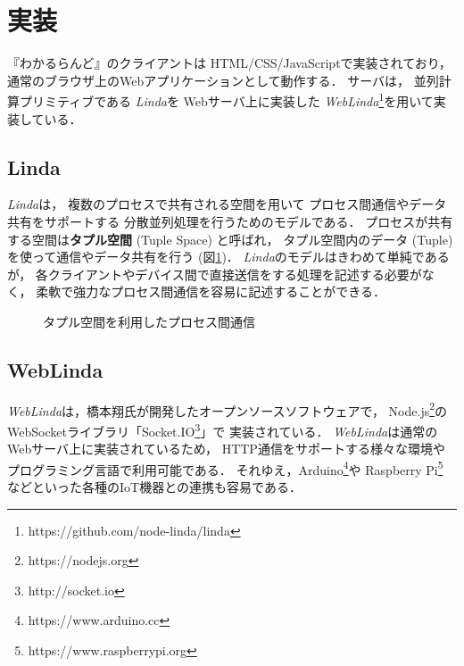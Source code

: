 \section{実装}

『わかるらんど』のクライアントは
HTML/CSS/JavaScriptで実装されており，
通常のブラウザ上のWebアプリケーションとして動作する．
%
サーバは，
並列計算プリミティブである
\textit{Linda}\cite{Carriero:1989:LC:63334.63337}を
Webサーバ上に実装した
\textit{WebLinda}\cite{shokai_furnitue}\footnote{https://github.com/node-linda/linda}を用いて実装している．

\subsection{Linda}

\textit{Linda}は，
複数のプロセスで共有される空間を用いて
プロセス間通信やデータ共有をサポートする
分散並列処理を行うためのモデルである．
プロセスが共有する空間は\textbf{タプル空間} (Tuple Space) と呼ばれ，
タプル空間内のデータ (Tuple) を使って通信やデータ共有を行う (図\ref{linda})．
\textit{Linda}のモデルはきわめて単純であるが，
各クライアントやデバイス間で直接送信をする処理を記述する必要がなく，
柔軟で強力なプロセス間通信を容易に記述することができる．

\begin{figure}[h]
\centering
{}
\caption{タプル空間を利用したプロセス間通信}
\label{linda}
\end{figure}

\subsection{WebLinda}

\textit{WebLinda}は，橋本翔氏が開発したオープンソースソフトウェアで，
Node.js\footnote{https://nodejs.org}の
WebSocketライブラリ「Socket.IO\footnote{http://socket.io}」で
実装されている．
\textit{WebLinda}は通常のWebサーバ上に実装されているため，
HTTP通信をサポートする様々な環境やプログラミング言語で利用可能である．
それゆえ，Arduino\footnote{https://www.arduino.cc}や
Raspberry Pi\footnote{https://www.raspberrypi.org}
などといった各種のIoT機器との連携も容易である．

